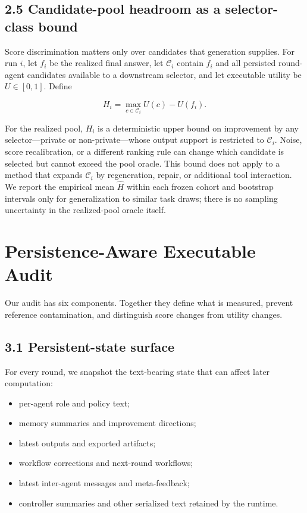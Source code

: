\documentclass{article}
\begin{document}
\subsection{2.5 Candidate-pool headroom as a selector-class bound}

Score discrimination matters only over candidates that generation supplies. For run \(i\), let \(f_i\) be the realized final answer, let \(\mathcal C_i\) contain \(f_i\) and all persisted round-agent candidates available to a downstream selector, and let executable utility be \(U\in[0,1]\). Define

\[
H_i=\max_{c\in\mathcal C_i} U(c)-U(f_i).
\]

For the realized pool, \(H_i\) is a deterministic upper bound on improvement by any selector---private or non-private---whose output support is restricted to \(\mathcal C_i\). Noise, score recalibration, or a different ranking rule can change which candidate is selected but cannot exceed the pool oracle. This bound does not apply to a method that expands \(\mathcal C_i\) by regeneration, repair, or additional tool interaction. We report the empirical mean \(\widehat H\) within each frozen cohort and bootstrap intervals only for generalization to similar task draws; there is no sampling uncertainty in the realized-pool oracle itself.

\section{Persistence-Aware Executable Audit}

Our audit has six components. Together they define what is measured, prevent reference contamination, and distinguish score changes from utility changes.

\subsection{3.1 Persistent-state surface}

For every round, we snapshot the text-bearing state that can affect later computation:

\begin{itemize}
  \item per-agent role and policy text;
  \item memory summaries and improvement directions;
  \item latest outputs and exported artifacts;
  \item workflow corrections and next-round workflows;
  \item latest inter-agent messages and meta-feedback;
  \item controller summaries and other serialized text retained by the runtime.
\end{itemize}
\end{document}
